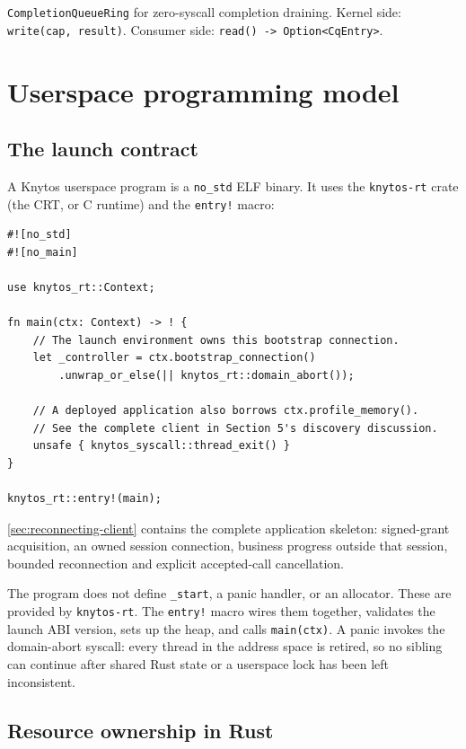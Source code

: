 \texttt{CompletionQueueRing} for zero-syscall completion draining.
Kernel side: \texttt{write(cap, result)}. Consumer side:
\texttt{read() -> Option<CqEntry>}.

\section{Userspace programming model}

\subsection{The launch contract}

A Knytos userspace program is a \texttt{no\_std} ELF binary. It uses
the \texttt{knytos-rt} crate (the CRT, or C runtime) and the \texttt{entry!}
macro:

\begin{lstlisting}[style=rustCode]
#![no_std]
#![no_main]

use knytos_rt::Context;

fn main(ctx: Context) -> ! {
    // The launch environment owns this bootstrap connection.
    let _controller = ctx.bootstrap_connection()
        .unwrap_or_else(|| knytos_rt::domain_abort());
        
    // A deployed application also borrows ctx.profile_memory().
    // See the complete client in Section 5's discovery discussion.
    unsafe { knytos_syscall::thread_exit() }
}

knytos_rt::entry!(main);
\end{lstlisting}

\autoref{sec:reconnecting-client} contains the complete application skeleton:
signed-grant acquisition, an owned session connection, business progress outside
that session, bounded reconnection and explicit accepted-call cancellation.

The program does not define \texttt{\_start}, a panic handler, or an allocator.
These are provided by \texttt{knytos-rt}. The \texttt{entry!} macro wires them
together, validates the launch ABI version, sets up the heap, and calls
\texttt{main(ctx)}. A panic invokes the domain-abort syscall: every thread in
the address space is retired, so no sibling can continue after shared Rust
state or a userspace lock has been left inconsistent.

\subsection{Resource ownership in Rust}

